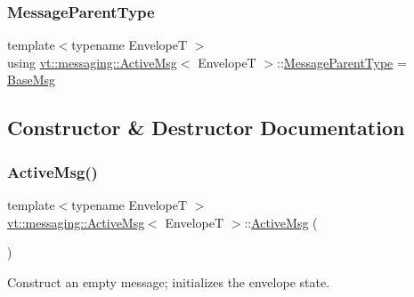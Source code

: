 \mbox{\label{structvt_1_1messaging_1_1_active_msg_ac2e6d93267991027ce78c968b17064c7}} 
\subsubsection{\texorpdfstring{Message\+Parent\+Type}{MessageParentType}}
{\footnotesize\ttfamily template$<$typename EnvelopeT $>$ \\
using \hyperlink{structvt_1_1messaging_1_1_active_msg}{vt\+::messaging\+::\+Active\+Msg}$<$ EnvelopeT $>$\+::\hyperlink{structvt_1_1messaging_1_1_active_msg_ac2e6d93267991027ce78c968b17064c7}{Message\+Parent\+Type} =  \hyperlink{structvt_1_1messaging_1_1_base_msg}{Base\+Msg}}



\subsection{Constructor \& Destructor Documentation}
\mbox{\label{structvt_1_1messaging_1_1_active_msg_a5fd6a7b78c86b8f1e36198142990a4c4}} 
\subsubsection{\texorpdfstring{Active\+Msg()}{ActiveMsg()}}
{\footnotesize\ttfamily template$<$typename EnvelopeT $>$ \\
\hyperlink{structvt_1_1messaging_1_1_active_msg}{vt\+::messaging\+::\+Active\+Msg}$<$ EnvelopeT $>$\+::\hyperlink{structvt_1_1messaging_1_1_active_msg}{Active\+Msg} (\begin{DoxyParamCaption}{ }\end{DoxyParamCaption})\hspace{0.3cm}{\ttfamily [inline]}}



Construct an empty message; initializes the envelope state. 



